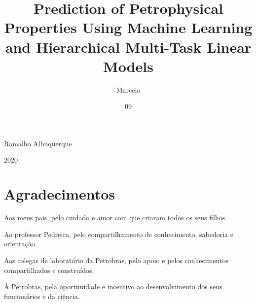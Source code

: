\documentclass[english,msc,numbers]{coppe}
\begin{document}
  \title{Prediction of Petrophysical Properties Using Machine Learning and Hierarchical Multi-Task Linear Models}
    \author{Marcelo}{Ramalho Albuquerque}
  

  

  \date{09}{2020}

  
  \maketitle

  \frontmatter
  \dedication{I just wondered how things were put together - Claude Shannon}

    \chapter*{Agradecimentos}
  Aos meus pais, pelo cuidado e amor com que criaram todos os seus filhos.
  
  \par
  
  Ao professor Pedreira, pelo compartilhamento de conhecimento, sabedoria e orientação.
  
  \par
  
  Aos colegas de laboratório da Petrobras, pelo apoio e pelos conhecimentos compartilhados e construídos.
  
  \par
  
  À Petrobras, pela oportunidade e incentivo ao desenvolvimento dos seus funcionários e da ciência.
  
  \par
  
\end{document}
